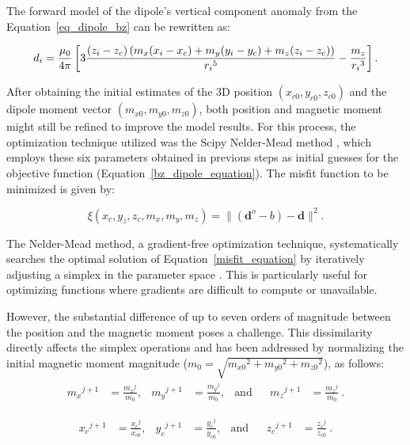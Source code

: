      The forward model of the dipole's vertical component anomaly from the Equation~\ref{eq_dipole_bz} can be rewritten as:

    \begin{equation}
        \small
        \label{bz_dipole_equation}
        {d}_{i} = \frac{\mu_0}{4 \pi} \left [ 3 \frac{ (z_i-z_c) \left ( m_x (x_i-x_c) + m_y (y_i-y_c) + m_z (z_i-z_c) \right )}{{r_i}^5} - \frac{m_z}{{r_i}^3} \right ] .
    \end{equation}
    
     After obtaining the initial estimates of the 3D position $(x_{c0}, y_{c0}, z_{c0})$ and the dipole moment vector $(m_{x0}, m_{y0}, m_{z0})$, both position and magnetic moment might still be refined to improve the model results. For this process, the optimization technique utilized was the Scipy Nelder-Mead method \citep{2020SciPy-NMeth}, which employs these six parameters obtained in previous steps as initial guesses for the objective function (Equation~\ref{bz_dipole_equation}). The misfit function to be minimized is given by:
    
    \begin{equation}
    \label{misfit_equation}
    \xi (x_c, y_z, z_c, m_x, m_y, m_z) = \| (\mathbf{d}^{o}-b) - \mathbf{d} \|^2.
    \end{equation} 
    
     The Nelder-Mead method, a gradient-free optimization technique, systematically searches the optimal solution of Equation~\ref{misfit_equation} by iteratively adjusting a simplex in the parameter space \citep{Nelder-Mead1965}. This is particularly useful for optimizing functions where gradients are difficult to compute or unavailable. 
     
     However, the substantial difference of up to seven orders of magnitude between the position and the magnetic moment poses a challenge. This dissimilarity directly affects the simplex operations and has been addressed by normalizing the initial magnetic moment magnitude ($m_0 = \sqrt{{m_{x0}}^2+{m_{y0}}^2+{m_{z0}}^2}$), as follows:
     \begin{align}
    \label{normalizing_m_parameters}
    {m_x}^{j+1} &= \frac{{m_x}^{j}}{m_0}, & {m_y}^{j+1} &= \frac{{m_y}^{j}}{m_0}, & \text{and} & &{m_z}^{j+1} &= \frac{{m_z}^{j}}{m_0}
    \ .
    \end{align}
     
     \begin{align}
    \label{normalizing_h_parameters}
    {x_c}^{j+1} &= \frac{{x_c}^{j}}{x_{c0}}, & {y_c}^{j+1} &= \frac{{y_c}^{j}}{y_{c0}}, & \text{and} & &{z_c}^{j+1} &= \frac{{z_c}^{j}}{z_{c0}}
    \ .
    \end{align}
    
